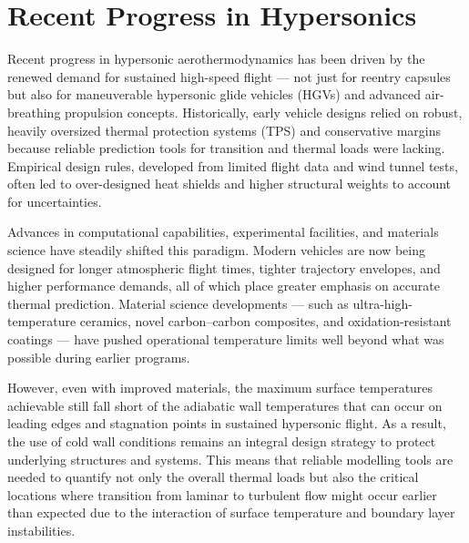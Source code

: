 


\newpage

\section{Recent Progress in Hypersonics}\label{section:introduction/recentprogress}
Recent progress in hypersonic aerothermodynamics has been driven by the renewed demand for sustained high-speed flight — not just for reentry capsules but also for maneuverable hypersonic glide vehicles (HGVs) and advanced air-breathing propulsion concepts. Historically, early vehicle designs relied on robust, heavily oversized thermal protection systems (TPS) and conservative margins because reliable prediction tools for transition and thermal loads were lacking. Empirical design rules, developed from limited flight data and wind tunnel tests, often led to over-designed heat shields and higher structural weights to account for uncertainties.

Advances in computational capabilities, experimental facilities, and materials science have steadily shifted this paradigm. Modern vehicles are now being designed for longer atmospheric flight times, tighter trajectory envelopes, and higher performance demands, all of which place greater emphasis on accurate thermal prediction. Material science developments — such as ultra-high-temperature ceramics, novel carbon–carbon composites, and oxidation-resistant coatings — have pushed operational temperature limits well beyond what was possible during earlier programs.

However, even with improved materials, the maximum surface temperatures achievable still fall short of the adiabatic wall temperatures that can occur on leading edges and stagnation points in sustained hypersonic flight. As a result, the use of cold wall conditions remains an integral design strategy to protect underlying structures and systems. This means that reliable modelling tools are needed to quantify not only the overall thermal loads but also the critical locations where transition from laminar to turbulent flow might occur earlier than expected due to the interaction of surface temperature and boundary layer instabilities.

